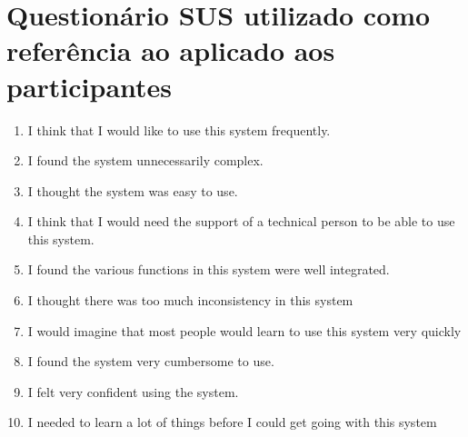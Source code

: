 \chapter{Questionário SUS utilizado como referência ao aplicado aos participantes}
\label{anexo:questionario}

\begin{enumerate}
    \item I think that I would like to use this system frequently.
    \item I found the system unnecessarily complex.
    \item I thought the system was easy to use.
    \item I think that I would need the support of a technical person to be able to use this system.
    \item I found the various functions in this system were well integrated.
    \item I thought there was too much inconsistency in this system
    \item I would imagine that most people would learn to use this system very quickly
    \item I found the system very cumbersome to use.
    \item I felt very confident using the system.
    \item I needed to learn a lot of things before I could get going  with this system
\end{enumerate}